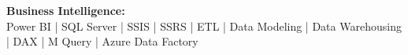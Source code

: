 \textbf{Business Intelligence:} \\ Power BI | SQL Server | SSIS | SSRS | ETL | Data Modeling | Data Warehousing | DAX | M Query | Azure Data Factory
